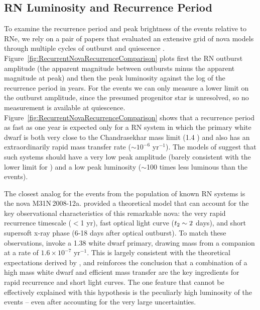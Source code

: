\subsection{RN Luminosity and Recurrence Period}\label{sec:RNLuminosityRecurrence}

To examine the recurrence period and peak brightness of the \spock
events relative to RNe, we rely on a pair of papers that evaluated an
extensive grid of nova models through multiple cycles of outburst and
quiescence \citep{Prialnik:1995,Yaron:2005}.
Figure~\ref{fig:RecurrentNovaRecurrenceComparison} plots first the RN
outburst amplitude (the apparent magnitude between outbursts minus the
apparent magnitude at peak) and then the peak luminosity against the
log of the recurrence period in years.
For the \spock events we can only measure a lower limit on the
outburst amplitude, since the presumed progenitor star is unresolved,
so no measurement is available at
quiescence. Figure~\ref{fig:RecurrentNovaRecurrenceComparison} shows
that a recurrence period as fast as one year is expected only for a RN
system in which the primary white dwarf is both very close to the Chandrasekhar
mass limit (1.4 \Msun) and also has an extraordinarily rapid mass
transfer rate ($\sim10^{-6}$ \Msun yr$^{-1}$).  The models of
\citet{Yaron:2005} suggest that such systems should have a very low
peak amplitude (barely consistent with the lower limit for \spock) and
a low peak luminosity ($\sim$100 times less luminous than the \spock
events).

The closest analog for the \spock events from the population of known
RN systems is the nova M31N\,2008-12a.  \citet{Kato:2015} provided a
theoretical model that can account for the key observational
characteristics of this remarkable nova: the very rapid recurrence
timescale ($<$1 yr), fast optical light curve ($\t2\sim2$ days), and
short supersoft x-ray phase (6-18 days after optical
  outburst)\citep{Henze:2015a}.  To match these observations,
\citet{Kato:2015} invoke a 1.38 \Msun white dwarf primary,
drawing mass from a companion at a rate of $1.6\times10^{-7}$ \Msun
yr$^{-1}$.  This is largely consistent with the theoretical
expectations derived by \citet{Yaron:2005}, and reinforces the
conclusion that a combination of a high mass white dwarf and efficient
mass transfer are the key ingredients for rapid recurrence and short
light curves. The one feature that cannot be effectively explained
with this hypothesis is the peculiarly high luminosity of the \spock
events -- even after accounting for the very large uncertainties. 
